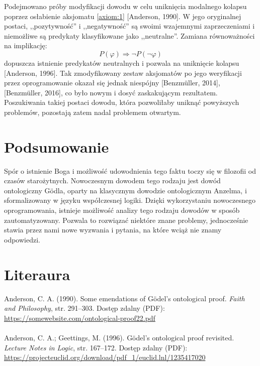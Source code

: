 \documentclass{eiti-raport}
\begin{document}
Podejmowano próby modyfikacji dowodu w celu uniknięcia modalnego kolapsu poprzez osłabienie aksjomatu \ref{axiom:1} [Anderson, 1990]. W jego oryginalnej postaci, ,,pozytywność'' i ,,negatywność'' są swoimi wzajemnymi zaprzeczeniami i niemożliwe są predykaty klasyfikowane jako ,,neutralne''. Zamiana równoważności na implikację:
\begin{equation*}
	P(\varphi) \Rightarrow \neg P( \neg \varphi )
\end{equation*}
dopuszcza istnienie predykatów neutralnych i pozwala na uniknięcie kolapsu [Anderson, 1996]. Tak zmodyfikowany zestaw aksjomatów po jego weryfikacji przez oprogramowanie okazał się jednak niespójny [Benzm\"uller, 2014], [Benzm\"uller, 2016], co było nowym i dosyć zaskakującym rezultatem. Poszukiwania takiej postaci dowodu, która pozwoliłaby uniknąć powyższych problemów, pozostają zatem nadal problemem otwartym. 

\section{Podsumowanie} \label{sec:summary}
Spór o istnienie Boga i możliwość udowodnienia tego faktu toczy się w filozofii od czasów starożytnych. Nowoczesnym dowodem tego rodzaju jest dowód ontologiczny G\"odla, oparty na klasycznym dowodzie ontologicznym Anzelma, i sformalizowany w języku współczesnej logiki. Dzięki wykorzystaniu nowoczesnego oprogramowania, istnieje możliwość analizy tego rodzaju dowodów w sposób zautomatyzowany. Pozwala to rozwiązać niektóre znane problemy, jednocześnie stawia przez nami nowe wyzwania i pytania, na które wciąż nie znamy odpowiedzi. 


\section*{Literaura}

\noindent [Anderson, 1990] Anderson, C. A. (1990). Some emendations of G\"odel’s ontological proof. \textit{Faith and Philosophy}, str. 291–303. Dostęp zdalny (PDF): \url{https://somewebsite.com/ontological-proof22.pdf}  
\\ \\
\noindent [Anderson, 1996] Anderson, C. A.; Geettings, M. (1996). G\"odel’s ontological proof revisited. \textit{Lecture Notes in Logic}, str. 167–172. Dostęp zdalny (PDF): \url{https://projecteuclid.org/download/pdf_1/euclid.lnl/1235417020}
\end{document}
